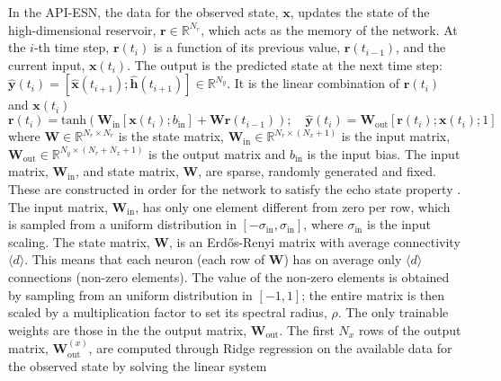 \documentclass[runningheads]{llncs}
\begin{document}
In the API-ESN, the data for the observed state, $\textbf{x}$, updates the state of the high-dimensional reservoir, $\textbf{r}\in\mathbb{R}^{N_r}$, which acts as the memory of the network. At the $i$-th time step, $\textbf{r}(t_i)$ is a function of its previous value, $\textbf{r}(t_{i-1})$, and the current input, $\textbf{x}(t_i)$. The output is the predicted state at the next time step: $\mathbf{\hat{y}}(t_i)=[\mathbf{\hat{x}}(t_{i+1});\mathbf{\hat{h}}(t_{i+1})]\in\mathbb{R}^{N_{y}}$.
It is the linear combination of $\textbf{r}(t_i)$ and $\textbf{x}(t_i)$
\begin{equation}
\label{state_step}
        \textbf{r}(t_i) = \textrm{tanh}\left(\mathbf{W}_{\mathrm{in}}[\textbf{x}(t_i);b_{\mathrm{in}}]+
        \mathbf{W}\textbf{r}(t_{i-1})\right); \quad \mathbf{\hat{y}}(t_i) = \mathbf{W}_{\mathrm{out}}[\mathbf{r}(t_i);\mathbf{x}(t_i);1]
\end{equation}
where $\mathbf{W}\in\mathbb{R}^{N_r\times N_r}$ is the state matrix, $\mathbf{W}_{\mathrm{in}}\in\mathbb{R}^{N_r\times (N_x+1)}$ is the input matrix, $\mathbf{W}_{\mathrm{out}}\in\mathbb{R}^{ N_{y}\times(N_r+N_x+1)}$ is the output matrix and $b_{\mathrm{in}}$ is the input bias.
The input matrix, $\mathbf{W}_{\mathrm{in}}$, and state matrix, $\mathbf{W}$, are sparse, randomly generated and fixed. These are constructed in order for the network to satisfy the echo state property \cite{lukovsevivcius2012practical}. The input matrix, $\mathbf{W}_{\mathrm{in}}$, has only one element different from zero per row, which is sampled from a uniform distribution in $[-\sigma_{\mathrm{in}},\sigma_{\mathrm{in}}]$, where $\sigma_{\mathrm{in}}$ is the input scaling. The state matrix, $\textbf{W}$, is an Erdős-Renyi matrix with average connectivity $\langle d\rangle$. This means that each neuron (each row of $\mathbf{W}$) has on average only $\langle d\rangle$ connections (non-zero elements). The value of the non-zero elements is obtained by sampling from an uniform distribution in $[-1,1]$; the entire matrix is then scaled by a multiplication factor to set its spectral radius, $\rho$. The only trainable weights are those in the the output matrix, $\mathbf{W}_{\mathrm{out}}$. %
The first $N_x$ rows of the output matrix,  $\mathbf{W}_{\textrm{out}}^{(x)}$, are computed through Ridge regression on the available data for the observed state by solving the linear system
\end{document}
